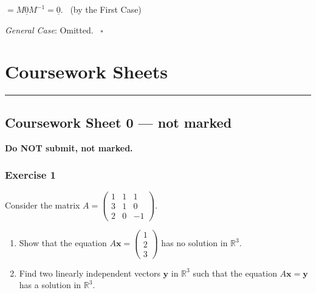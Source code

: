 \documentclass[
  12pt,
  a4paper,
  twoside]{article}
\theoremstyle{plain}
\theoremstyle{definition}
\begin{document}
\hspace*{0.333em}\hspace*{0.333em}\hspace*{0.333em}\hspace*{0.333em}\hspace*{0.333em}\hspace*{0.333em}\hspace*{0.333em}\hspace*{0.333em}\hspace*{0.333em}\hspace*{0.333em}\hspace*{0.333em}\hspace*{0.333em} \(= M \underline{0} M^{-1} = \underline{0}\). \hfill~{(by the First Case)}

\emph{General Case}: Omitted.
\hfill~{\(\square\)}

\newpage

\hypertarget{courseworks}{%
\section{Coursework Sheets}\label{courseworks}}

\begin{center}\rule{0.5\linewidth}{0.5pt}\end{center}

\hypertarget{coursework-sheet-0-not-marked}{%
\subsection{Coursework Sheet 0 --- not marked}\label{coursework-sheet-0-not-marked}}

\textbf{Do NOT submit, not marked.}

\hypertarget{exercise-1}{%
\subsubsection*{Exercise 1}\label{exercise-1}}

Consider the matrix \(A=\begin{pmatrix}1&1&1\\ 3&1&0\\ 2&0&-1\end{pmatrix}\).

\begin{enumerate}
\def\labelenumi{(\alph{enumi})}
\item
  Show that the equation \(A\mathbf{x}=\begin{pmatrix}1\\2\\3\end{pmatrix}\) has no solution in \(\mathbb{R}^3\).
\item
  Find two linearly independent vectors \(\mathbf{y}\) in \(\mathbb{R}^3\) such that the equation \(A\mathbf{x}=\mathbf{y}\) has a solution in \(\mathbb{R}^3\).
\end{enumerate}
\end{document}
